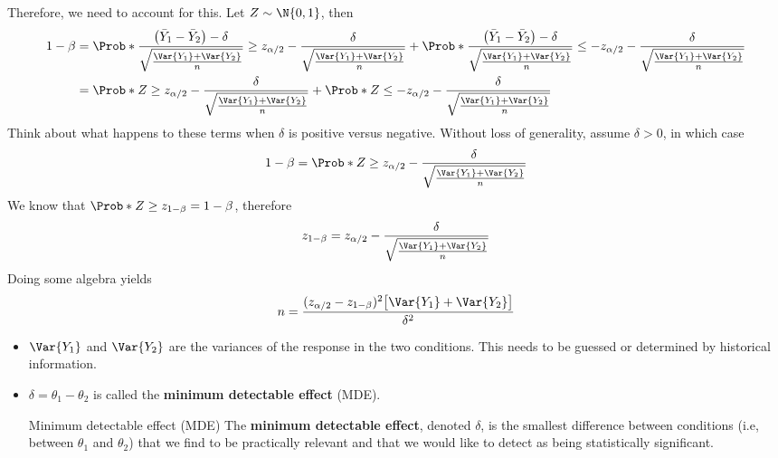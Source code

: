 Therefore, we need to account for this. Let $ Z \sim \N{0,1} $, then
\begin{align*}
      1-\beta
       & =\Prob*{\frac{\bigl(\bar{Y}_1-\bar{Y}_2\bigr)-\delta}{\sqrt{\frac{\Var{Y_1}+\Var{Y_2}}{n}}}\ge z_{\alpha/2}-\frac{\delta}{\sqrt{\frac{\Var{Y_1}+\Var{Y_2}}{n}}}}+\Prob*{\frac{\bigl(\bar{Y}_1-\bar{Y}_2\bigr)-\delta}{\sqrt{\frac{\Var{Y_1}+\Var{Y_2}}{n}}}\le -z_{\alpha/2}-\frac{\delta}{\sqrt{\frac{\Var{Y_1}+\Var{Y_2}}{n}}}} \\
       & =\Prob*{Z\ge z_{\alpha/2}-\frac{\delta}{\sqrt{\frac{\Var{Y_1}+\Var{Y_2}}{n}}}}+\Prob*{Z\le -z_{\alpha/2}-\frac{\delta}{\sqrt{\frac{\Var{Y_1}+\Var{Y_2}}{n}}}}
\end{align*}
Think about what happens to these terms when $ \delta $ is positive versus negative.
Without loss of generality, assume $ \delta>0 $, in which case
\[ 1-\beta=\Prob*{Z\ge z_{\alpha/2}-\frac{\delta}{\sqrt{\frac{\Var{Y_1}+\Var{Y_2}}{n}}}} \]
We know that $ \Prob*{Z\ge z_{1-\beta}}=1-\beta $, therefore
\[ z_{1-\beta}=z_{\alpha/2}-\frac{\delta}{\sqrt{\frac{\Var{Y_1}+\Var{Y_2}}{n}}} \]
Doing some algebra yields
\[ n=\frac{(z_{\alpha/2}-z_{1-\beta})^2\bigl[\Var{Y_1}+\Var{Y_2}\bigr]}{\delta^2}  \]
\begin{itemize}
      \item $ \Var{Y_1} $ and $ \Var{Y_2} $ are the variances of the response in the two conditions.
            This needs to be guessed or determined by historical information.
      \item $ \delta=\theta_1-\theta_2 $ is called the \textbf{minimum detectable effect} (MDE).
            \begin{Definition}{Minimum detectable effect (MDE)}{}
                  The \textbf{minimum detectable effect}, denoted $ \delta $,
                  is the smallest difference between conditions (i.e, between
                  $ \theta_1 $ and $ \theta_2 $)
                  that we find to be practically relevant and that we would like
                  to detect as being statistically significant.
            \end{Definition}
\end{itemize}
